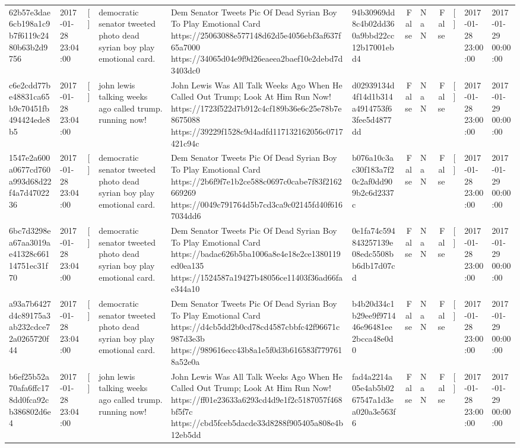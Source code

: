 \begin{tabular}{llllllrlrlll}
62b57e3dae6cb198a1c9b7f6119c2480b63b2d9756 & 2017-01-28 23:04:00 & [] & democratic senator tweeted photo dead syrian boy play emotional card. & Dem Senator Tweets Pic Of Dead Syrian Boy To Play Emotional Card https://25063088e577148d62d5e4056ebf3af637f65a7000 https://34065d04e9f9d26eaeea2baef10e2debd7d3403dc0 & 94b30969dd8c4b02dd360a9bbd22cc12b17001ebd4 & False & NaN & False & [] & 2017-01-28 23:00:00 & 2017-01-29 00:00:00 \\
c6e2cdd77be48831ca65b9c70451fb494424ede8b5 & 2017-01-28 23:04:00 & [] & john lewis talking weeks ago called trump. running now! & John Lewis Was All Talk Weeks Ago When He Called Out Trump; Look At Him Run Now! https://1723f522d7b912c4cf189b36e6c25e78b7e8675088 https://39229f1528c9d4adfd117132162056c0717421c94c & d02939134d4f14d1b314a4914753f63fee5d4877dd & False & NaN & False & [] & 2017-01-28 23:00:00 & 2017-01-29 00:00:00 \\
1547e2a600a0677cd760a993d68d22f4a7d4702236 & 2017-01-28 23:04:00 & [] & democratic senator tweeted photo dead syrian boy play emotional card. & Dem Senator Tweets Pic Of Dead Syrian Boy To Play Emotional Card https://2b6f9f7e1b2ce588c0697c0cabe7f83f2162669269 https://0049c791764d5b7cd3ca9c02145fd40f6167034dd6 & b076a10c3ac30f183a7f20c2af0dd909b2c6d2337c & False & NaN & False & [] & 2017-01-28 23:00:00 & 2017-01-29 00:00:00 \\
6bc7d3298ea67aa3019ae41328c66114751ec31f70 & 2017-01-28 23:04:00 & [] & democratic senator tweeted photo dead syrian boy play emotional card. & Dem Senator Tweets Pic Of Dead Syrian Boy To Play Emotional Card https://badac626b5ba1006a8e4e18e2ce1380119ed0ea135 https://1524587a19427b48056ce11403f36ad66fae344a10 & 0e1fa74c594843257139e08edc5508bb6db17d07cd & False & NaN & False & [] & 2017-01-28 23:00:00 & 2017-01-29 00:00:00 \\
a93a7b6427d4c89175a3ab232cdce72a0265720f44 & 2017-01-28 23:04:00 & [] & democratic senator tweeted photo dead syrian boy play emotional card. & Dem Senator Tweets Pic Of Dead Syrian Boy To Play Emotional Card https://d4cb5dd2b0cd78cd4587cbbfc42f96671c987d3e3b https://989616ecc43b8a1e5f0d3b616583f7797618a52e0a & b4b20d34c1b29ee9f971446e96481ee2bcca48e0d0 & False & NaN & False & [] & 2017-01-28 23:00:00 & 2017-01-29 00:00:00 \\
b6ef25b52a70afa6ffc178dd0fca92cb386802d6e4 & 2017-01-28 23:04:00 & [] & john lewis talking weeks ago called trump. running now! & John Lewis Was All Talk Weeks Ago When He Called Out Trump; Look At Him Run Now! https://ff01e23633a6293cd4d9e1f2c5187057f468bf5f7c https://cbd5fceb5dacde33d8288f905405a808e4b12eb5dd & fad4a2214a05e4ab5b0267547a1d3ea020a3e563f6 & False & NaN & False & [] & 2017-01-28 23:00:00 & 2017-01-29 00:00:00 \\

\end{tabular}
